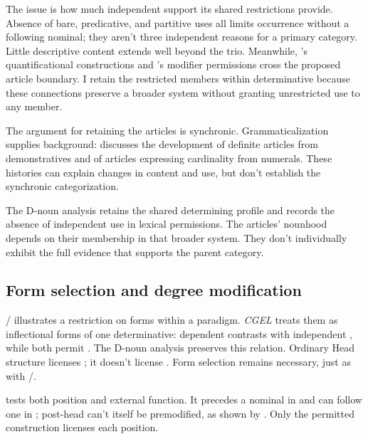 \documentclass[12pt]{article}
\begin{document}
The issue is how much independent support its shared restrictions provide. Absence of bare, predicative, and partitive uses all limits occurrence without a following nominal; they aren't three independent reasons for a primary category. Little descriptive content extends well beyond the trio. Meanwhile, 's quantificational constructions and 's modifier permissions cross the proposed article boundary. I retain the restricted members within determinative because these connections preserve a broader system without granting unrestricted use to any member.

The argument for retaining the articles is synchronic. Grammaticalization supplies background: \textcite[331--336]{lyons1999} discusses the development of definite articles from demonstratives and of articles expressing cardinality from numerals. These histories can explain changes in content and use, but don't establish the synchronic categorization.

The D-noun analysis retains the shared determining profile and records the absence of independent use in lexical permissions. The articles' nounhood depends on their membership in that broader system. They don't individually exhibit the full evidence that supports the parent category.

\subsection{Form selection and degree modification}\label{sec:enough}

/ illustrates a restriction on forms within a paradigm. \textit{CGEL} treats them as inflectional forms of one determinative: dependent  contrasts with independent , while both permit  \citep[389--390]{huddleston2002}. The D-noun analysis preserves this relation. Ordinary Head structure licenses ; it doesn't license . Form selection remains necessary, just as with /.

 tests both position and external function. It precedes a nominal in  and can follow one in ; post-head  can't itself be premodified, as shown by  \citep[396--397, 445]{huddleston2002}. Only the permitted construction licenses each position.
\end{document}
